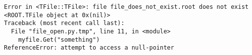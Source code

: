 \begin{footnotesize}
\begin{verbatim}
Error in <TFile::TFile>: file file_does_not_exist.root does not exist
<ROOT.TFile object at 0x(nil)>
Traceback (most recent call last):
  File "file_open.py.tmp", line 11, in <module>
    myfile.Get("something")
ReferenceError: attempt to access a null-pointer
\end{verbatim}
\end{footnotesize}
